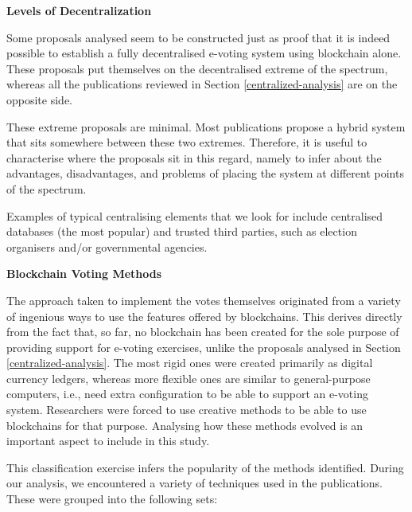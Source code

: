 \documentclass[../access.tex]{subfiles}
\begin{document}
\par
\textbf{Levels of Decentralization}
\par
Some proposals analysed seem to be constructed just as proof that it is indeed possible to establish a fully decentralised e-voting system using blockchain alone. These proposals put themselves on the decentralised extreme of the spectrum, whereas all the publications reviewed in Section \ref{centralized-analysis} are on the opposite side.
\par
These extreme proposals are minimal. Most publications propose a hybrid system that sits somewhere between these two extremes. Therefore, it is useful to characterise where the proposals sit in this regard, namely to infer about the advantages, disadvantages, and problems of placing the system at different points of the spectrum.
\par
Examples of typical centralising elements that we look for include centralised databases (the most popular) and trusted third parties, such as election organisers and/or governmental agencies.
\par
\textbf{Blockchain Voting Methods}
\par
The approach taken to implement the votes themselves originated from a variety of ingenious ways to use the features offered by blockchains. This derives directly from the fact that, so far, no blockchain has been created for the sole purpose of providing support for e-voting exercises, unlike the proposals analysed in Section \ref{centralized-analysis}. The most rigid ones were created primarily as digital currency ledgers, whereas more flexible ones are similar to general-purpose computers, i.e., need extra configuration to be able to support an e-voting system. Researchers were forced to use creative methods to be able to use blockchains for that purpose. Analysing how these methods evolved is an important aspect to include in this study.
\par
This classification exercise infers the popularity of the methods identified. During our analysis, we encountered a variety of techniques used in the publications. These were grouped into the following sets:
\end{document}
